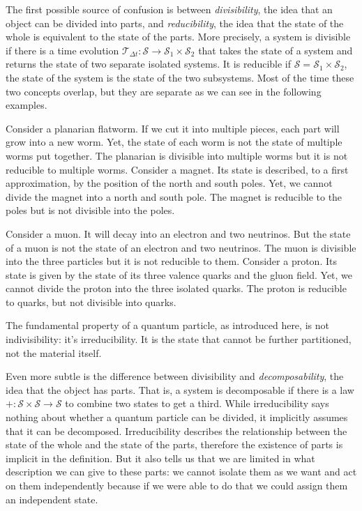 \documentclass[smallextended]{svjour3}
\numberwithin{equation}{section}
\theoremstyle{definition}
\begin{document}
The first possible source of confusion is between \textit{divisibility}, the idea that an object can be divided into parts, and \textit{reducibility}, the idea that the state of the whole is equivalent to the state of the parts. More precisely, a system is divisible if there is a time evolution $\mathcal{T}_{\Delta t}: \mathcal{S} \rightarrow \mathcal{S}_1 \times \mathcal{S}_2$ that takes the state of a system and returns the state of two separate isolated systems. It is reducible if $\mathcal{S} = \mathcal{S}_1 \times \mathcal{S}_2$, the state of the system is the state of the two subsystems. Most of the time these two concepts overlap, but they are separate as we can see in the following examples.

Consider a planarian flatworm. If we cut it into multiple pieces, each part will grow into a new worm. Yet, the state of each worm is not the state of multiple worms put together. The planarian is divisible into multiple worms but it is not reducible to multiple worms. Consider a magnet. Its state is described, to a first approximation, by the position of the north and south poles. Yet, we cannot divide the magnet into a north and south pole. The magnet is reducible to the poles but is not divisible into the poles.

Consider a muon. It will decay into an electron and two neutrinos. But the state of a muon is not the state of an electron and two neutrinos. The muon is divisible into the three particles but it is not reducible to them. Consider a proton. Its state is given by the state of its three valence quarks and the gluon field. Yet, we cannot divide the proton into the three isolated quarks. The proton is reducible to quarks, but not divisible into quarks.

The fundamental property of a quantum particle, as introduced here, is not indivisibility: it's irreducibility. It is the state that cannot be further partitioned, not the material itself.

Even more subtle is the difference between divisibility and \textit{decomposability}, the idea that the object has parts. That is, a system is decomposable if there is a law $+ : \mathcal{S} \times \mathcal{S} \rightarrow \mathcal{S}$ to combine two states to get a third. While irreducibility says nothing about whether a quantum particle can be divided, it implicitly assumes that it can be decomposed. Irreducibility describes the relationship between the state of the whole and the state of the parts, therefore the existence of parts is implicit in the definition. But it also tells us that we are limited in what description we can give to these parts: we cannot isolate them as we want and act on them independently because if we were able to do that we could assign them an independent state.
\end{document}
